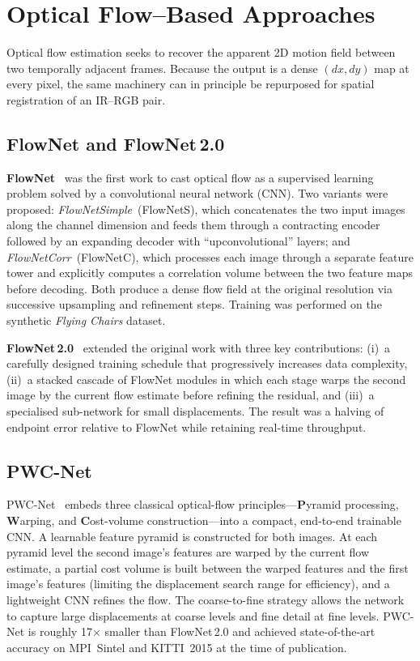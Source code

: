 \section{Optical Flow--Based Approaches}
\label{sec:optflow}

Optical flow estimation seeks to recover the apparent 2D motion field
between two temporally adjacent frames.  Because the output is a dense
$(dx,dy)$ map at every pixel, the same machinery can in principle be
repurposed for spatial registration of an IR--RGB pair.

\subsection{FlowNet and FlowNet\,2.0}

\textbf{FlowNet}~\cite{dosovitskiy2015flownet} was the first work to
cast optical flow as a supervised learning problem solved by a
convolutional neural network (CNN).  Two variants were proposed:
\emph{FlowNetSimple}~(FlowNetS), which concatenates the two input
images along the channel dimension and feeds them through a contracting
encoder followed by an expanding decoder with ``upconvolutional''
layers; and \emph{FlowNetCorr}~(FlowNetC), which processes each image
through a separate feature tower and explicitly computes a correlation
volume between the two feature maps before decoding.  Both produce a
dense flow field at the original resolution via successive upsampling and
refinement steps.  Training was performed on the synthetic \emph{Flying
Chairs} dataset.

\textbf{FlowNet\,2.0}~\cite{ilg2017flownet2} extended the original work
with three key contributions: (i)~a carefully designed training schedule
that progressively increases data complexity, (ii)~a stacked cascade of
FlowNet modules in which each stage warps the second image by the
current flow estimate before refining the residual, and (iii)~a
specialised sub-network for small displacements.  The result was a
halving of endpoint error relative to FlowNet while retaining real-time
throughput.

\subsection{PWC-Net}

PWC-Net~\cite{sun2018pwcnet} embeds three classical optical-flow
principles---\textbf{P}yramid processing, \textbf{W}arping, and
\textbf{C}ost-volume construction---into a compact, end-to-end trainable
CNN.  A learnable feature pyramid is constructed for both images.  At
each pyramid level the second image's features are warped by the
current flow estimate, a partial cost volume is built between the warped
features and the first image's features (limiting the displacement
search range for efficiency), and a lightweight CNN refines the flow.
The coarse-to-fine strategy allows the network to capture large
displacements at coarse levels and fine detail at fine levels.  PWC-Net
is roughly 17$\times$ smaller than FlowNet\,2.0 and achieved
state-of-the-art accuracy on MPI~Sintel and KITTI~2015 at the time of
publication.

